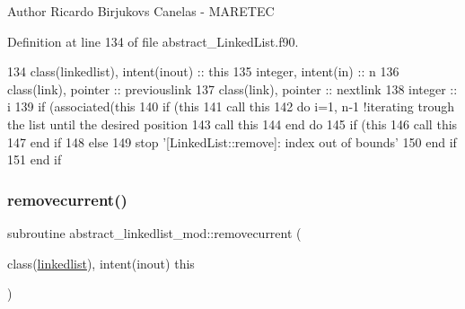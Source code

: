 \begin{DoxyAuthor}{Author}
Ricardo Birjukovs Canelas -\/ M\+A\+R\+E\+T\+EC 
\end{DoxyAuthor}


Definition at line 134 of file abstract\+\_\+\+Linked\+List.\+f90.


\begin{DoxyCode}
134     \textcolor{keywordtype}{class}(linkedlist), \textcolor{keywordtype}{intent(inout)} :: this
135     \textcolor{keywordtype}{integer}, \textcolor{keywordtype}{intent(in)} :: n
136     \textcolor{keywordtype}{class}(link), \textcolor{keywordtype}{pointer} :: previouslink
137     \textcolor{keywordtype}{class}(link), \textcolor{keywordtype}{pointer} :: nextlink
138     \textcolor{keywordtype}{integer} :: i
139     \textcolor{keywordflow}{if} (\textcolor{keyword}{associated}(this%
140         \textcolor{keywordflow}{if} (this%
141             \textcolor{keyword}{call }this%
142             \textcolor{keywordflow}{do} i=1, n-1    \textcolor{comment}{!iterating trough the list until the desired position}
143                 \textcolor{keyword}{call }this%
144 \textcolor{keywordflow}{            end do}
145             \textcolor{keywordflow}{if} (this%
146                 \textcolor{keyword}{call }this%
147 \textcolor{keywordflow}{            end if}
148         \textcolor{keywordflow}{else}
149             stop \textcolor{stringliteral}{'[LinkedList::remove]: index out of bounds'}
150 \textcolor{keywordflow}{        end if}
151 \textcolor{keywordflow}{    end if}
\end{DoxyCode}
\mbox{\label{namespaceabstract__linkedlist__mod_ae725ed63dd3b08d29e1c4ff824e05589}} 
\subsubsection{\texorpdfstring{removecurrent()}{removecurrent()}}
{\footnotesize\ttfamily subroutine abstract\+\_\+linkedlist\+\_\+mod\+::removecurrent (\begin{DoxyParamCaption}\item[{class(\mbox{\hyperlink{structabstract__linkedlist__mod_1_1linkedlist}{linkedlist}}), intent(inout)}]{this }\end{DoxyParamCaption})\hspace{0.3cm}{\ttfamily [private]}}



